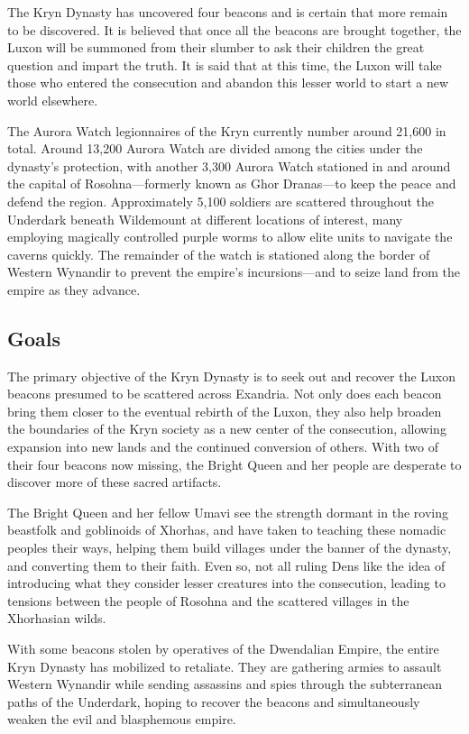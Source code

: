\documentclass[10pt,a4paper,twoside,bg=print,twocolumn,openany,nodeprecatedcode]{dndbook}
\begin{document}
The Kryn Dynasty has uncovered four beacons and is certain that more remain to be discovered. It is believed that once all the beacons are brought together, the Luxon will be summoned from their slumber to ask their children the great question and impart the truth. It is said that at this time, the Luxon will take those who entered the consecution and abandon this lesser world to start a new world elsewhere.

The Aurora Watch legionnaires of the Kryn currently number around 21,600 in total. Around 13,200 Aurora Watch are divided among the cities under the dynasty's protection, with another 3,300 Aurora Watch stationed in and around the capital of Rosohna—formerly known as Ghor Dranas—to keep the peace and defend the region. Approximately 5,100 soldiers are scattered throughout the Underdark beneath Wildemount at different locations of interest, many employing magically controlled purple worms to allow elite units to navigate the caverns quickly. The remainder of the watch is stationed along the border of Western Wynandir to prevent the empire's incursions—and to seize land from the empire as they advance.

\subsection{Goals}
The primary objective of the Kryn Dynasty is to seek out and recover the Luxon beacons presumed to be scattered across Exandria. Not only does each beacon bring them closer to the eventual rebirth of the Luxon, they also help broaden the boundaries of the Kryn society as a new center of the consecution, allowing expansion into new lands and the continued conversion of others. With two of their four beacons now missing, the Bright Queen and her people are desperate to discover more of these sacred artifacts.

The Bright Queen and her fellow Umavi see the strength dormant in the roving beastfolk and goblinoids of Xhorhas, and have taken to teaching these nomadic peoples their ways, helping them build villages under the banner of the dynasty, and converting them to their faith. Even so, not all ruling Dens like the idea of introducing what they consider lesser creatures into the consecution, leading to tensions between the people of Rosohna and the scattered villages in the Xhorhasian wilds.

With some beacons stolen by operatives of the Dwendalian Empire, the entire Kryn Dynasty has mobilized to retaliate. They are gathering armies to assault Western Wynandir while sending assassins and spies through the subterranean paths of the Underdark, hoping to recover the beacons and simultaneously weaken the evil and blasphemous empire.
\end{document}
